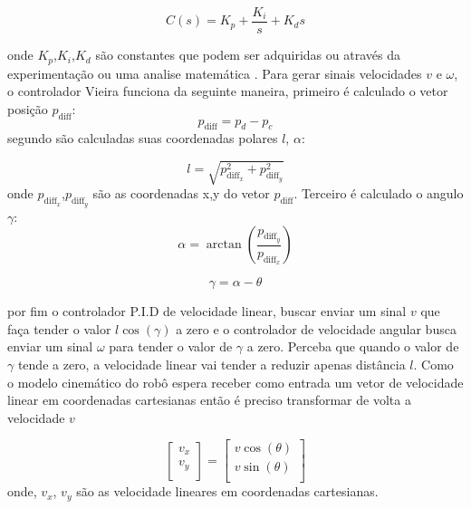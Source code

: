 \begin{equation}
    C(s) = K_p + \frac{K_i}{s} + K_ds
\end{equation}

onde $K_p$,$K_i$,$K_d$ são constantes que podem ser adquiridas ou
através da experimentação ou uma analise matemática \cite{ogataengenharia}. Para gerar sinais
velocidades $v$ e $\omega$,  o controlador Vieira funciona da seguinte
maneira, primeiro é calculado o vetor posição $p_{\text{diff}}$:
\[
    p_{\text{diff}} = p_d - p_c 
\]
segundo são calculadas suas coordenadas polares $l$, $\alpha$:

\[
    l = \sqrt{p_{\text{diff}_x}^2 + p_{\text{diff}_y}^2}
\]
onde $p_{\text{diff}_x}$,$p_{\text{diff}_y}$ são as coordenadas x,y
do vetor $p_{\text{diff}}$.  Terceiro é calculado o angulo $\gamma$:
\[
    \alpha =  \arctan(\frac{ p_{\text{diff}_y}}{p_{\text{diff}_x}}) 
\]

\[
    \gamma =  \alpha - \theta
\]


por fim o controlador P.I.D de velocidade
linear, buscar enviar um sinal $v$ que faça tender o valor $l \cos(\gamma)$
a zero e o controlador de velocidade angular busca enviar um sinal $\omega$
para  tender o valor de $\gamma$ a zero. Perceba que quando o valor de $\gamma$
tende a zero, a velocidade linear vai tender a reduzir apenas
distância $l$. Como o modelo cinemático do robô espera receber como entrada
um vetor de velocidade linear em coordenadas cartesianas então é preciso
transformar de volta a velocidade $v$ 

\[
    \begin{bmatrix}
        v_x \\
        v_y \\
    \end{bmatrix}
    =
    \begin{bmatrix}
        v\cos(\theta) \\
        v\sin(\theta) \\
    \end{bmatrix}
\]
onde, $v_x$, $v_y$ são as velocidade lineares em coordenadas cartesianas.